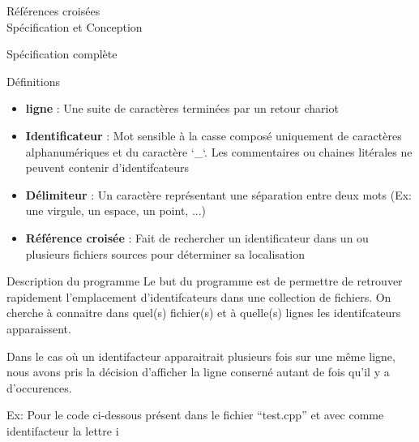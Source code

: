\documentclass{article}
\begin{document}
\begin{center} 
\Huge{Références croisées \\ Spécification et Conception}
\end{center}



\begin{section}{Spécification complète}


  \begin{subsection}{Définitions}

    \begin{itemize}
      \item \textbf{ligne} : Une suite de caractères terminées par un retour chariot

      \item \textbf{Identificateur} : Mot sensible à la casse composé uniquement de caractères alphanumériques et du caractère `\_`. 
				      Les commentaires ou chaines litérales ne peuvent contenir d'identifcateurs

      \item \textbf{Délimiteur} : Un caractère représentant une séparation entre deux mots (Ex: une virgule, un espace, un point, ...) 

      \item \textbf{Référence croisée} : Fait de rechercher un identificateur dans un ou plusieurs fichiers sources pour déterminer sa localisation
    \end{itemize}

  \end{subsection}


  \begin{subsection}{Description du programme}
    Le but du programme est de permettre de retrouver rapidement l'emplacement d'identifcateurs dans une collection de fichiers.
    On cherche à connaitre dans quel(s) fichier(s) et à quelle(s) lignes les identifcateurs apparaissent.
    
    Dans le cas où un identifacteur apparaitrait plusieurs fois sur une même ligne, nous avons pris la décision d'afficher
    la ligne conserné autant de fois qu'il y a d'occurences. 
    
    Ex: Pour le code ci-dessous présent dans le fichier ``test.cpp'' et avec comme identifacteur la lettre i 
    

\end{subsection}
\end{section}
\end{document}
